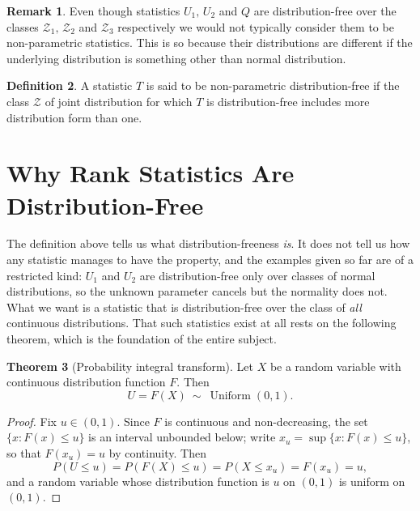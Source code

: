 \documentclass[12pt,a4paper]{report}
\theoremstyle{definition}
\newtheorem{thm}{Theorem}[section]
\newtheorem{defn}[thm]{Definition}
\newtheorem{remark}[thm]{Remark}
\theoremstyle{plain}
\begin{document}
\begin{remark}
Even though statistics $U_1, \, U_2$ and $Q$ are distribution-free over the classes $\mathscr{Z}_1,\, \mathscr{Z}_2$ and $\mathscr{Z}_3$ respectively we would not typically consider them to be non-parametric statistics. This is so because their distributions are different if the underlying distribution is something other than normal distribution.
\end{remark}


\begin{defn}
A statistic $T$ is said to be non-parametric distribution-free if the class $\mathscr{Z}$ of joint distribution for which $T$ is distribution-free includes more distribution form than one.
\end{defn}
 
 
 
 
 
 \section{Why Rank Statistics Are Distribution-Free}

The definition above tells us what distribution-freeness \emph{is}. It does not
tell us how any statistic manages to have the property, and the examples given
so far are of a restricted kind: $U_1$ and $U_2$ are distribution-free only over
classes of normal distributions, so the unknown parameter cancels but the
normality does not. What we want is a statistic that is distribution-free over
the class of \emph{all} continuous distributions. That such statistics exist at
all rests on the following theorem, which is the foundation of the entire
subject.

\begin{thm}[Probability integral transform]
\label{thm:pit}
Let $X$ be a random variable with continuous distribution function $F$. Then
$$U = F(X)\ \sim\ \operatorname{Uniform}(0,1).$$
\end{thm}

\begin{proof}
Fix $u\in(0,1)$. Since $F$ is continuous and non-decreasing, the set
$\{x: F(x)\leq u\}$ is an interval unbounded below; write
$x_u = \sup\{x : F(x)\leq u\}$, so that $F(x_u) = u$ by continuity. Then
$$P(U\leq u) = P\left(F(X)\leq u\right) = P(X\leq x_u) = F(x_u) = u ,$$
and a random variable whose distribution function is $u$ on $(0,1)$ is uniform
on $(0,1)$.
\end{proof}
\end{document}
